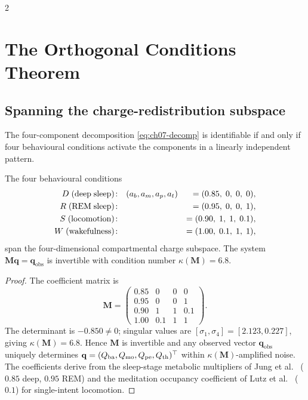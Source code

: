 \begin{multicols}{2}

\section{The Orthogonal Conditions Theorem}
\label{sec:ch07-orthogonal}

\subsection{Spanning the charge-redistribution subspace}

The four-component decomposition \eqref{eq:ch07-decomp} is identifiable
if and only if four behavioural conditions activate the components in a
linearly independent pattern.

\begin{theorem}
\label{thm:ch07-orthogonal}
The four behavioural conditions
\begin{alignat}{2}
  D\;({\rm deep\;sleep})\!: &\quad (a_b,a_m,a_p,a_t) &= (0.85,\;0,\;0,\;0),
    \notag\\
  R\;({\rm REM\;sleep})\!: &\quad                     &= (0.95,\;0,\;0,\;1),
    \notag\\
  S\;({\rm locomotion})\!: &\quad                     &= (0.90,\;1,\;1,\;0.1),
    \notag\\
  W\;({\rm wakefulness})\!: &\quad                    &= (1.00,\;0.1,\;1,\;1),
    \notag
\end{alignat}
span the four-dimensional compartmental charge subspace.  The system
$\mathbf{M}\mathbf{q} = \mathbf{q}_{\mathrm{obs}}$ is invertible with
condition number $\kappa(\mathbf{M}) = 6.8$.
\end{theorem}

\begin{proof}
The coefficient matrix is
\begin{equation}
  \mathbf{M} =
  \begin{pmatrix}
    0.85 & 0    & 0   & 0   \\
    0.95 & 0    & 0   & 1   \\
    0.90 & 1    & 1   & 0.1 \\
    1.00 & 0.1  & 1   & 1
  \end{pmatrix}.
  \label{eq:ch07-Mmatrix}
\end{equation}
The determinant is $-0.850\neq 0$; singular values are
$[\sigma_1,\sigma_4] = [2.123, 0.227]$, giving
$\kappa(\mathbf{M}) = 6.8$.  Hence $\mathbf{M}$ is invertible and any
observed vector $\mathbf{q}_{\mathrm{obs}}$ uniquely determines
$\mathbf{q} = (Q_{\mathrm{ba}},Q_{\mathrm{mo}},Q_{\mathrm{pe}},Q_{\mathrm{th}})^\top$ within
$\kappa(\mathbf{M})$-amplified noise.  The coefficients derive from the
sleep-stage metabolic multipliers of Jung et al.\ \citep{jung2011} ($0.85$
deep, $0.95$ REM) and the meditation occupancy coefficient of Lutz et
al.\ \citep{lutz2004} ($0.1$) for single-intent locomotion.
\end{proof}


\end{multicols}
